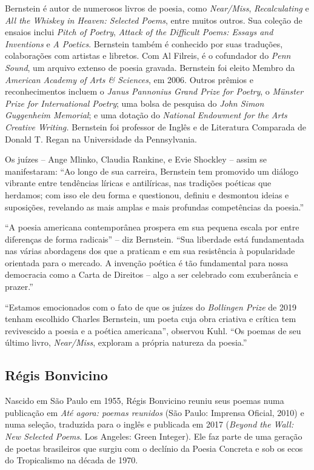 Bernstein é autor de numerosos livros de poesia, como \emph{Near/Miss},
\emph{Recalculating} e \emph{All the Whiskey in Heaven: Selected Poems},
entre muitos outros. Sua coleção de ensaios inclui \emph{Pitch of
Poetry}, \emph{Attack of the Difficult Poems: Essays and Inventions} e
\emph{A Poetics}. Bernstein também é conhecido por suas traduções,
colaborações com artistas e libretos. Com Al Filreis, é o cofundador do
\emph{Penn Sound}, um arquivo extenso de poesia gravada. Bernstein foi
eleito Membro da \emph{American Academy of Arts \& Sciences}, em 2006.
Outros prêmios e reconhecimentos incluem o \emph{Janus Pannonius Grand
Prize for Poetry}, o \emph{Münster Prize for International Poetry}; uma
bolsa de pesquisa do \emph{John Simon} \emph{Guggenheim Memorial}; e uma
dotação do \emph{National Endowment for the Arts Creative
Writing.} Bernstein foi professor de Inglês e de Literatura Comparada de
Donald T. Regan na Universidade da Pennsylvania.

Os juízes -- Ange Mlinko, Claudia Rankine, e Evie Shockley -- assim se
manifestaram: ``Ao longo de sua carreira, Bernstein tem promovido um
diálogo vibrante entre tendências líricas e antilíricas, nas tradições
poéticas que herdamos; com isso ele deu forma e questionou, definiu e
desmontou ideias e suposições, revelando as mais amplas e mais profundas
competências da poesia.''

``A poesia americana contemporânea prospera em sua pequena escala por
entre diferenças de forma radicais'' -- diz Bernstein. ``Sua liberdade
está fundamentada nas várias abordagens dos que a praticam e em sua
resistência à popularidade orientada para o mercado. A invenção poética
é tão fundamental para nossa democracia como a Carta de Direitos -- algo
a ser celebrado com exuberância e prazer.''

``Estamos emocionados com o fato de que os juízes do \emph{Bollingen
Prize} de 2019 tenham escolhido Charles Bernstein, um poeta cuja obra
criativa e crítica tem revivescido a poesia e a poética americana'',
observou Kuhl. ``Os poemas de seu último livro, \emph{Near/Miss},
exploram a própria natureza da poesia.''

\subsection{Régis Bonvicino}

Nascido em São Paulo em 1955, Régis Bonvicino reuniu seus poemas numa
publicação em \emph{Até agora: poemas reunidos} (São Paulo: Imprensa
Oficial, 2010) e numa seleção, traduzida para o inglês e publicada em
2017 (\emph{Beyond the Wall: New Selected Poems}. Los Angeles: Green
Integer). Ele faz parte de uma geração de poetas brasileiros que surgiu
com o declínio da Poesia Concreta e sob os ecos do Tropicalismo na
década de 1970.

